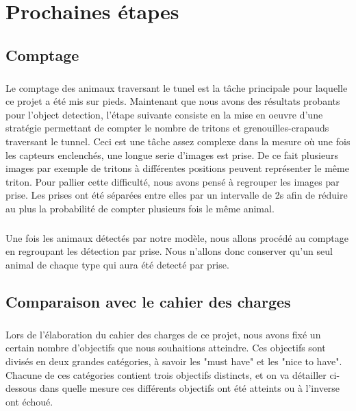\chapter{Prochaines étapes}
\section{Comptage}\label{anal:comptage}
\paragraph{} Le comptage des animaux traversant le tunel est la tâche principale pour laquelle ce projet a été mis sur pieds. Maintenant que nous avons des résultats probants pour l'object detection, l'étape suivante consiste en la mise en oeuvre d'une stratégie permettant de compter le nombre de tritons et grenouilles-crapauds traversant le tunnel. Ceci est une tâche assez complexe dans la mesure où une fois les capteurs enclenchés, une longue serie d'images est prise. De ce fait plusieurs images par exemple de tritons à différentes positions peuvent représenter le même triton. Pour pallier cette difficulté, nous avons pensé à regrouper les images par prise. Les prises ont été séparées entre elles par un intervalle de 2s afin de réduire au plus la probabilité de compter plusieurs fois le même animal. 

\paragraph{} Une fois les animaux détectés par notre modèle, nous allons procédé au comptage en regroupant les détection par prise. Nous n'allons donc conserver qu'un seul animal de chaque type qui aura été detecté par prise. 

\section{Comparaison avec le cahier des charges}

\paragraph{} Lors de l'élaboration du cahier des charges de ce projet, nous avons fixé un certain nombre d'objectifs que nous souhaitions atteindre. Ces objectifs sont divisés en deux grandes catégories, à savoir les "must have" et les "nice to have". Chacune de ces catégories contient trois objectifs distincts, et on va détailler ci-dessous dans quelle mesure ces différents objectifs ont été atteints ou à l'inverse ont échoué.

